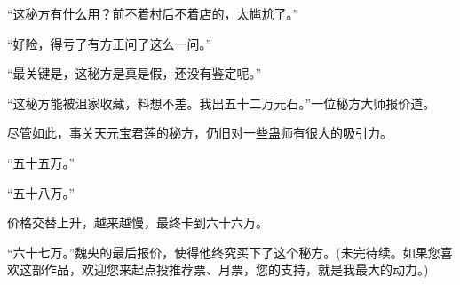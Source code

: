 \begin{this_body}
“这秘方有什么用？前不着村后不着店的，太尴尬了。”

“好险，得亏了有方正问了这么一问。”

“最关键是，这秘方是真是假，还没有鉴定呢。”

“这秘方能被沮家收藏，料想不差。我出五十二万元石。”一位秘方大师报价道。

尽管如此，事关天元宝君莲的秘方，仍旧对一些蛊师有很大的吸引力。

“五十五万。”

“五十八万。”

价格交替上升，越来越慢，最终卡到六十六万。

“六十七万。”魏央的最后报价，使得他终究买下了这个秘方。(未完待续。如果您喜欢这部作品，欢迎您来起点投推荐票、月票，您的支持，就是我最大的动力。)

\end{this_body}

